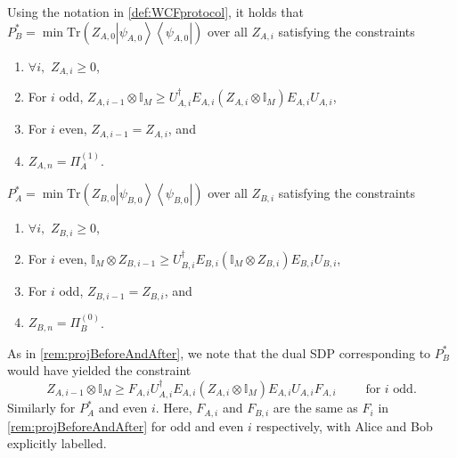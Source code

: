 \documentclass{theoretics}
\newcommand{\atul}[1]{#1} %
\begin{document}
\begin{theorem}[Dual] Using the notation in \cref{def:WCFprotocol}, it holds that
  \label{thm:dual}~\\
  $P_{B}^{*}=\min\text{Tr}(Z_{A,0}\left|\psi_{A,0}\right\rangle \left\langle \psi_{A,0}\right|)$
  over all $Z_{A,i}$ satisfying the constraints
  \begin{enumerate}
    \item $\forall i,$ $Z_{A,i}\ge0$,
    \item For $i$ odd, $Z_{A,i-1}\otimes\mathbb{I}_{M}\ge U_{A,i}^{\dagger}E_{A,i}(Z_{A,i}\otimes\mathbb{I}_{M})E_{A,i}U_{A,i}$,
    \item For $i$ even, $Z_{A,i-1}=Z_{A,i}$, and
    \item $Z_{A,n}=\Pi_{A}^{(1)}$.
  \end{enumerate}
  $P_{A}^{*}=\min\text{Tr}(Z_{B,0}\left|\psi_{B,0}\right\rangle \left\langle \psi_{B,0}\right|)$
  over all $Z_{B,i}$ satisfying the constraints
  \begin{enumerate}
    \item $\forall i,$ $Z_{B,i}\ge0$,
    \item For $i$ even, $\mathbb{I}_{M}\otimes Z_{B,i-1}\ge U_{B,i}^{\dagger}E_{B,i}(\mathbb{I}_{M}\otimes Z_{B,i})E_{B,i}U_{B,i}$,
    \item For $i$ odd, $Z_{B,i-1}=Z_{B,i}$, and
    \item $Z_{B,n}=\Pi_{B}^{(0)}$.
  \end{enumerate}
\end{theorem}

%


\begin{remark}
  As in \cref{rem:projBeforeAndAfter}, we note that the dual SDP corresponding to $P_{B}^{*}$
  would have yielded the constraint
  \begin{displaymath}
    Z_{A,i-1}\otimes\mathbb{I}_{M}\ge F_{A,i}U_{A,i}^{\dagger}E_{A,i}\left(Z_{A,i}\otimes\mathbb{I}_{M}\right)E_{A,i}U_{A,i}F_{A,i} \qquad \text{  for $i$ odd}.
  \end{displaymath}
  Similarly for $P_A^*$ and even $i$. \atul{Here, $F_{A,i}$ and $F_{B,i}$ are the same as $F_i$ in \cref{rem:projBeforeAndAfter} for odd and even $i$ respectively, with Alice and Bob explicitly labelled.}
  \label{rem:projBeforeAndAfterDual}
\end{remark}
%
%

%
\end{document}
